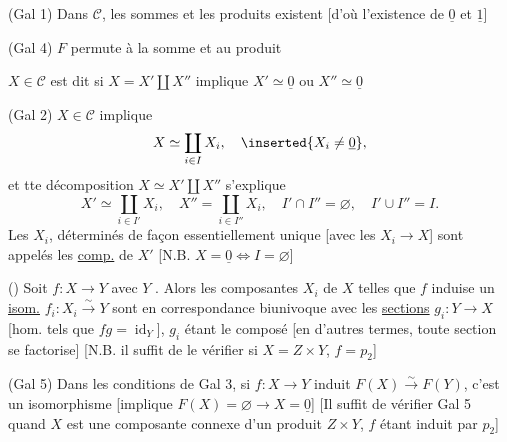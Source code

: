 (Gal 1) Dans $\mathcal C$, les sommes et les produits  existent [d'où l'existence de $\underline0$ et $\underline1$]


(Gal 4) $F$ permute à la somme et au produit

$X\in\mathcal C$ est dit  si $X=X'\amalg X''$ implique $X'\simeq\underline0$ ou $X''\simeq\underline0$

(Gal 2) $X\in\mathcal C$  implique
\[
X\simeq\coprod_{i\in I}X_i,\quad \inserted{X_i\ne\underline0},
\]
et tte décomposition $X\simeq X'\amalg X''$ s'explique
\[
X'\simeq\coprod_{i\in I'}X_i,\quad X''=\coprod_{i\in I''}X_i,\quad
I'\cap I''=\varnothing,\quad I'\cup I''=I.
\]
Les $X_i$, déterminés de façon essentiellement unique [avec les $X_i\to X$] sont appelés les \uline{comp.}  de $X'$ [N.B. $X=\underline0\Longleftrightarrow I=\varnothing$]

() Soit $f:X\to Y$ avec $Y$ .
Alors les composantes  $X_i$ de $X$ telles que $f$ induise un \uline{isom.} $f_i:X_i\overset{\sim}{\longrightarrow}Y$ sont en correspondance biunivoque avec les \uline{sections} $g_i:Y\to X$ 
[hom. tels que $fg=\operatorname{id}_Y$], $g_i$ étant le composé 
[en d'autres termes, toute section se factorise]
[N.B. il suffit de le vérifier si $X=Z\times Y$, $f=p_2$]


(Gal 5) Dans les conditions de Gal 3, si  $f:X\to Y$ induit $F(X)\overset{\sim}{\longrightarrow}F(Y)$, c'est un isomorphisme
[implique $F(X)=\varnothing\longrightarrow X=\underline0$]
[Il suffit de vérifier Gal 5 quand $X$ est une composante connexe d'un produit $Z\times Y$, $f$ étant induit par $p_2$]

